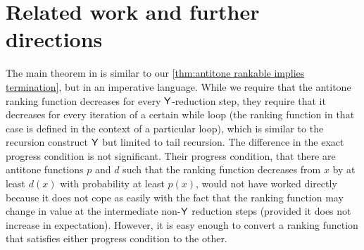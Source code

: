 \section{Related work and further directions}
\label{sec:related}

 




The main theorem in \cite{DBLP:journals/pacmpl/McIverMKK18} is similar to our \ref{thm:antitone rankable implies termination}, but in an imperative language. While we require that the antitone ranking function decreases for every $\mathsf{Y}$-reduction step, they require that it decreases for every iteration of a certain while loop (the ranking function in that case is defined in the context of a particular loop), which is similar to the recursion construct $\mathsf{Y}$ but limited to tail recursion. The difference in the exact progress condition is not significant. Their progress condition, that there are antitone functions $p$ and $d$ such that the ranking function decreases from $x$ by at least $d(x)$ with probability at least $p(x)$, would not have worked directly because it does not cope as easily with the fact that the ranking function may change in value at the intermediate non-$\mathsf{Y}$ reduction steps (provided it does not increase in expectation). However, it is easy enough to convert a ranking function that satisfies either progress condition to the other.

